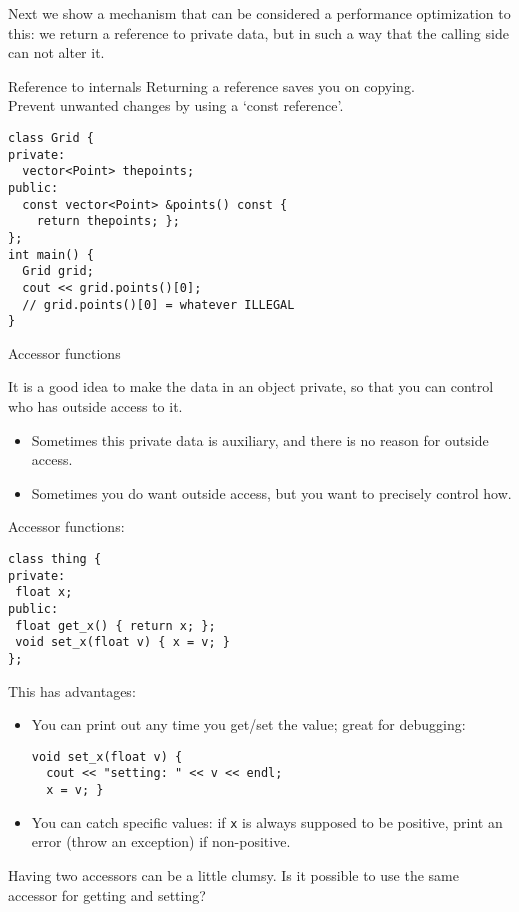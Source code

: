 Next we show a mechanism that can be considered a performance optimization
to this: we return a reference to private data, but in such a way
that the calling side can not alter it.

\begin{block}{Reference to internals}
  \label{sl:obj-return-const-ref}
  Returning a reference saves you on copying.\\
  Prevent unwanted changes by using a `const reference'.
  \lstset{style=snippetcode}
\begin{lstlisting}
class Grid {
private:
  vector<Point> thepoints;
public:
  const vector<Point> &points() const {
    return thepoints; };
};
int main() {
  Grid grid;
  cout << grid.points()[0];
  // grid.points()[0] = whatever ILLEGAL
}
\end{lstlisting}
\end{block}

 {Accessor functions}
\label{sec:cpp-accessor}

It is a good idea to make the data in an object private,
so that you can control who has outside access to it.
\begin{itemize}
\item Sometimes this private data is auxiliary, and there is no reason
  for outside access.
\item Sometimes you do want outside access, but you want to precisely
  control how.
\end{itemize}

Accessor functions:
\begin{lstlisting}
class thing {
private:
 float x;
public:
 float get_x() { return x; };
 void set_x(float v) { x = v; }
};
\end{lstlisting}
This has advantages:
\begin{itemize}
\item You can print out any time you get/set the value; great for
  debugging:
\begin{lstlisting}
void set_x(float v) {
  cout << "setting: " << v << endl;
  x = v; }
\end{lstlisting}
\item You can catch specific values: if \lstinline{x} is always supposed to be
  positive, print an error (throw an exception) if non-positive.
\end{itemize}

Having two accessors can be a little clumsy. Is it possible to use the
same accessor for getting and setting?

